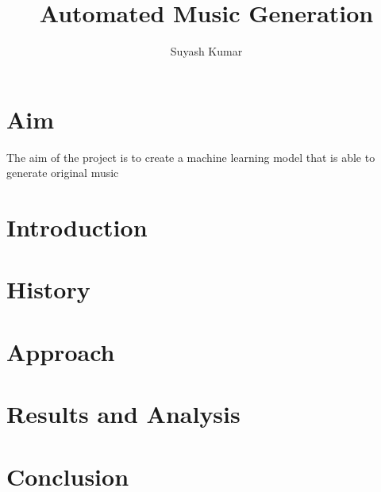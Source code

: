 \documentclass[11pt]{article}
\begin{document}
\title{Automated Music Generation}

\author{Suyash Kumar}

\maketitle

\section{Aim}
The aim of the project is to create a machine learning model that is able to generate original music
\section{Introduction}
\section{History}
\section{Approach}
\section{Results and Analysis}
\section{Conclusion}
\end{document}
